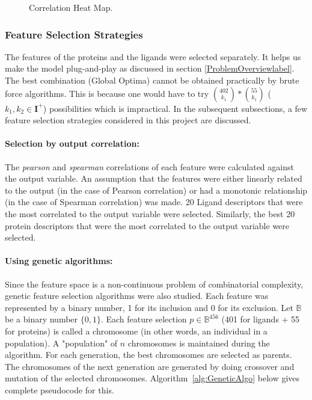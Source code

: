 \documentclass[11pt]{article}
\begin{document}
\begin{figure}[htb]
\begin{subfigure}[b]{0.45\textwidth}
        \label{fig:correlationfr}
     \end{subfigure}
     \caption{Correlation Heat Map.}
     \label{fig:correlationheatmap}
\end{figure}

\subsubsection{Feature Selection Strategies}


The features of the proteins and the ligands were selected separately.
It helps us make the model plug-and-play as discussed in section \ref{ProblemOverviewlabel}.
The best combination (Global Optima) cannot be obtained practically by brute force algorithms.
This is because one would have to try $\binom{402}{k_1} * \binom{55}{k_1}$ ($k_1, k_2 \in \mathbf{I}^+$) possibilities which is impractical.
In the subsequent subsections, a few feature selection strategies considered in this project are discussed.

\paragraph{Selection by output correlation:}
The \textit{pearson} and \textit{spearman} correlations of each feature were calculated against the output variable.
An assumption that the features were either linearly related to the output (in the case of Pearson correlation) or had a monotonic relationship (in the case of Spearman correlation) was made.
20 Ligand descriptors that were the most correlated to the output variable were selected.  Similarly, the best 20 protein descriptors that were the most correlated to the output variable were selected.

\paragraph{Using genetic algorithms:}
\label{geneticalgorithmssection}
Since the feature space is a non-continuous problem of combinatorial complexity, genetic feature selection algorithms \cite{genetic_algorithm} were also studied.
Each feature was represented by a binary number, 1 for its inclusion and 0 for its exclusion.
Let $\mathbb{B}$ be a binary number $\{0,  1\}$.
Each feature selection $p \in \mathbb{B}^{456}$ (401 for ligands + 55 for proteins) is called a chromosome (in other words, an individual in a population).
A "population" of $n$ chromosomes is maintained during the algorithm.
For each generation,  the best chromosomes are selected as parents.
The chromosomes of the next generation are generated by doing crossover and mutation of the selected chromosomes.
Algorithm~\ref{alg:GeneticAlgo} below gives complete pseudocode for this.
\end{document}
